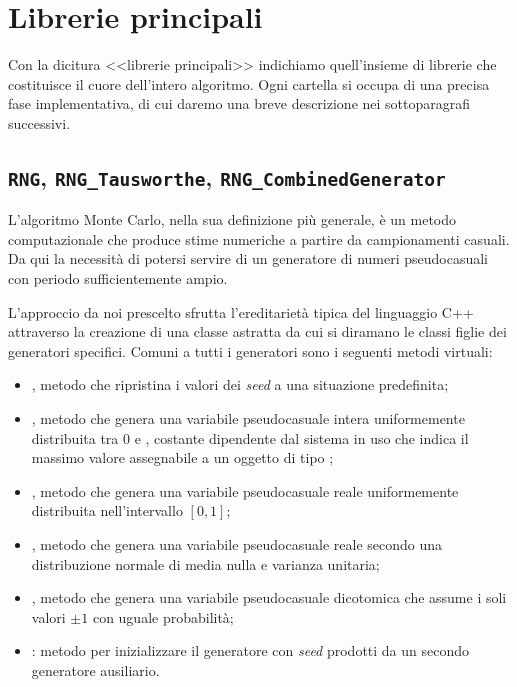 \section{Librerie principali}
Con la dicitura <<librerie principali>> indichiamo quell'insieme di librerie che costituisce il cuore dell'intero algoritmo. Ogni cartella si occupa di una precisa fase implementativa, di cui daremo una breve descrizione nei sottoparagrafi successivi.

\subsection{\texttt{RNG}, \texttt{RNG\_Tausworthe}, \texttt{RNG\_CombinedGenerator}}
L'algoritmo Monte Carlo, nella sua definizione più generale, è un metodo computazionale che produce stime numeriche a partire da campionamenti casuali. Da qui la necessità di potersi servire di un generatore di numeri pseudocasuali con periodo sufficientemente ampio.

L'approccio da noi prescelto sfrutta l'ereditarietà tipica del linguaggio C++ attraverso la creazione di una classe astratta  da cui si diramano le classi figlie dei generatori specifici. Comuni a tutti i generatori sono i seguenti metodi virtuali:
\begin{itemize}
    \item {}, metodo che ripristina i valori dei \textit{seed} a una situazione predefinita;
    \item {}, metodo che genera una variabile pseudocasuale intera uniformemente distribuita tra $0$ e , costante dipendente dal sistema in uso che indica il massimo valore assegnabile a un oggetto di tipo ;
    \item {}, metodo che genera una variabile pseudocasuale reale uniformemente distribuita nell'intervallo $[0,1]$;
    \item {}, metodo che genera una variabile pseudocasuale reale secondo una distribuzione normale di media nulla e varianza unitaria;
    \item {}, metodo che genera una variabile pseudocasuale dicotomica che assume i soli valori $\pm1$ con uguale probabilità;
    \item {}: metodo per inizializzare il generatore con \textit{seed} prodotti da un secondo generatore ausiliario.
\end{itemize}

